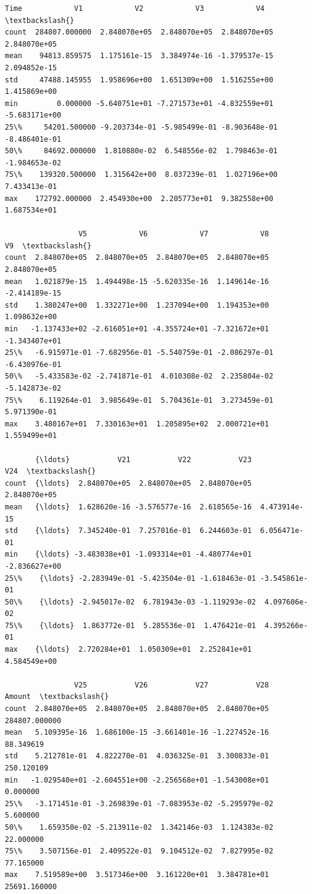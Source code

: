 \documentclass[11pt]{article}
\makeatletter
\newcommand{\boxspacing}{\kern\kvtcb@left@rule\kern\kvtcb@boxsep}
\newcommand{\prompt}[4]{
        {\ttfamily\llap{{\color{#2}[#3]:\hspace{3pt}#4}}\vspace{-\baselineskip}}
    }
\makeatother
\begin{document}
            \begin{tcolorbox}[breakable, size=fbox, boxrule=.5pt, pad at break*=1mm, opacityfill=0]
\prompt{Out}{outcolor}{6}{\boxspacing}
\begin{Verbatim}[commandchars=\\\{\}]
                Time            V1            V2            V3            V4  \textbackslash{}
count  284807.000000  2.848070e+05  2.848070e+05  2.848070e+05  2.848070e+05
mean    94813.859575  1.175161e-15  3.384974e-16 -1.379537e-15  2.094852e-15
std     47488.145955  1.958696e+00  1.651309e+00  1.516255e+00  1.415869e+00
min         0.000000 -5.640751e+01 -7.271573e+01 -4.832559e+01 -5.683171e+00
25\%     54201.500000 -9.203734e-01 -5.985499e-01 -8.903648e-01 -8.486401e-01
50\%     84692.000000  1.810880e-02  6.548556e-02  1.798463e-01 -1.984653e-02
75\%    139320.500000  1.315642e+00  8.037239e-01  1.027196e+00  7.433413e-01
max    172792.000000  2.454930e+00  2.205773e+01  9.382558e+00  1.687534e+01

                 V5            V6            V7            V8            V9  \textbackslash{}
count  2.848070e+05  2.848070e+05  2.848070e+05  2.848070e+05  2.848070e+05
mean   1.021879e-15  1.494498e-15 -5.620335e-16  1.149614e-16 -2.414189e-15
std    1.380247e+00  1.332271e+00  1.237094e+00  1.194353e+00  1.098632e+00
min   -1.137433e+02 -2.616051e+01 -4.355724e+01 -7.321672e+01 -1.343407e+01
25\%   -6.915971e-01 -7.682956e-01 -5.540759e-01 -2.086297e-01 -6.430976e-01
50\%   -5.433583e-02 -2.741871e-01  4.010308e-02  2.235804e-02 -5.142873e-02
75\%    6.119264e-01  3.985649e-01  5.704361e-01  3.273459e-01  5.971390e-01
max    3.480167e+01  7.330163e+01  1.205895e+02  2.000721e+01  1.559499e+01

       {\ldots}           V21           V22           V23           V24  \textbackslash{}
count  {\ldots}  2.848070e+05  2.848070e+05  2.848070e+05  2.848070e+05
mean   {\ldots}  1.628620e-16 -3.576577e-16  2.618565e-16  4.473914e-15
std    {\ldots}  7.345240e-01  7.257016e-01  6.244603e-01  6.056471e-01
min    {\ldots} -3.483038e+01 -1.093314e+01 -4.480774e+01 -2.836627e+00
25\%    {\ldots} -2.283949e-01 -5.423504e-01 -1.618463e-01 -3.545861e-01
50\%    {\ldots} -2.945017e-02  6.781943e-03 -1.119293e-02  4.097606e-02
75\%    {\ldots}  1.863772e-01  5.285536e-01  1.476421e-01  4.395266e-01
max    {\ldots}  2.720284e+01  1.050309e+01  2.252841e+01  4.584549e+00

                V25           V26           V27           V28         Amount  \textbackslash{}
count  2.848070e+05  2.848070e+05  2.848070e+05  2.848070e+05  284807.000000
mean   5.109395e-16  1.686100e-15 -3.661401e-16 -1.227452e-16      88.349619
std    5.212781e-01  4.822270e-01  4.036325e-01  3.300833e-01     250.120109
min   -1.029540e+01 -2.604551e+00 -2.256568e+01 -1.543008e+01       0.000000
25\%   -3.171451e-01 -3.269839e-01 -7.083953e-02 -5.295979e-02       5.600000
50\%    1.659350e-02 -5.213911e-02  1.342146e-03  1.124383e-02      22.000000
75\%    3.507156e-01  2.409522e-01  9.104512e-02  7.827995e-02      77.165000
max    7.519589e+00  3.517346e+00  3.161220e+01  3.384781e+01   25691.160000


\end{Verbatim}
\end{tcolorbox}
\end{document}
